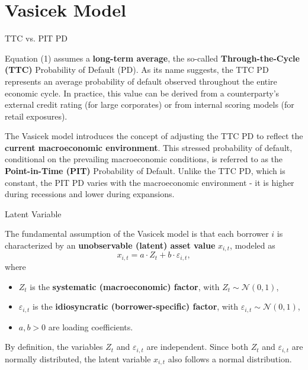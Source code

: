 \documentclass{beamer}
\begin{document}
\section{Vasicek Model}

\begin{frame}{TTC vs. PIT PD}
\justifying
\small

Equation (1) assumes a \textbf{long-term average}, the so-called \textbf{Through-the-Cycle (TTC)} Probability of Default (PD). As its name suggests, the TTC PD represents an average probability of default observed throughout the entire economic cycle. In practice, this value can be derived from a counterparty's external credit rating (for large corporates) or from internal scoring models (for retail exposures).

\medskip

The Vasicek model introduces the concept of adjusting the TTC PD to reflect the \textbf{current macroeconomic environment}. This stressed probability of default, conditional on the prevailing macroeconomic conditions, is referred to as the \textbf{Point-in-Time (PIT)} Probability of Default. Unlike the TTC PD, which is constant, the PIT PD varies with the macroeconomic environment - it is higher during recessions and lower during expansions.

\end{frame}

\begin{frame}{Latent Variable}
\justifying
\small

The fundamental assumption of the Vasicek model is that each borrower $i$ is characterized by an \textbf{unobservable (latent) asset value} $x_{i,t}$, modeled as
\begin{equation}
x_{i,t} = a \cdot Z_t + b \cdot \varepsilon_{i,t},
\end{equation}
where
\begin{itemize}
    \item $Z_t$ is the \textbf{systematic (macroeconomic) factor}, with $Z_t \sim \mathcal{N}(0,1)$,
    \item $\varepsilon_{i,t}$ is the \textbf{idiosyncratic (borrower-specific) factor}, with $\varepsilon_{i,t} \sim \mathcal{N}(0,1)$,
    \item $a, b > 0$ are loading coefficients.
\end{itemize}

\medskip

By definition, the variables $Z_t$ and $\varepsilon_{i,t}$ are independent. Since both $Z_t$ and $\varepsilon_{i,t}$ are normally distributed, the latent variable $x_{i,t}$ also follows a normal distribution.

\end{frame}
\end{document}
